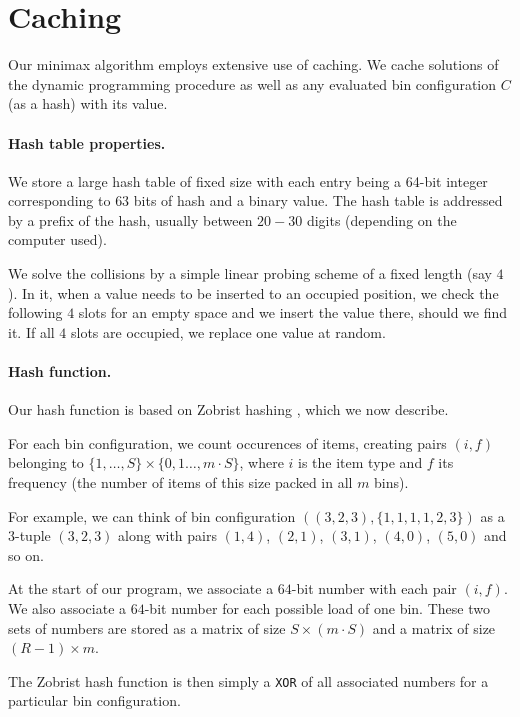 \section{Caching}\label{sec:4:caching}

Our minimax algorithm employs extensive use of caching. We cache
solutions of the dynamic programming procedure \MaxFeas as well as any
evaluated bin configuration $C$ (as a hash) with its value.

\paragraph{Hash table properties.} We store a large hash table of
fixed size with each entry being a 64-bit integer corresponding to
$63$ bits of hash and a binary value. The hash table is addressed
by a prefix of the hash, usually between $20-30$ digits (depending
on the computer used).

We solve the collisions by a simple linear probing scheme of a fixed
length (say $4$). In it, when a value needs to be inserted to an
occupied position, we check the following $4$ slots for an empty space
and we insert the value there, should we find it. If all $4$ slots are
occupied, we replace one value at random.

\paragraph{Hash function.} Our hash function is based on Zobrist
hashing \cite{zobrist}, which we now describe.

For each bin configuration, we count occurences of items, creating
pairs $(i,f)$ belonging to $\{1,\ldots,S\} \times \{0,1\ldots,m\cdot S\}$, where $i$ is the item type
and $f$ its frequency (the number of items of this size packed in all $m$ bins).

For example, we can think of bin configuration
$((3,2,3),\{1,1,1,1,2,3\})$ as a $3$-tuple $(3,2,3)$ along with pairs
$(1,4)$, $(2,1)$, $(3,1)$, $(4,0)$, $(5,0)$ and so on.

At the start of our program, we associate a $64$-bit number with each
pair $(i,f)$. We also associate a $64$-bit number for each possible
load of one bin. These two sets of numbers are stored as a matrix of
size $S \times (m\cdot S)$ and a matrix of size $(R-1) \times m$.

The Zobrist hash function is then simply a \texttt{XOR} of all
associated numbers for a particular bin configuration.

